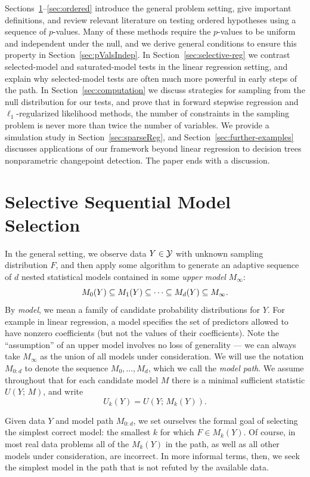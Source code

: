 \documentclass{article}
\begin{document}
Sections~\ref{sec:genericSetting}--\ref{sec:ordered} introduce the general problem setting, give important definitions, and review relevant literature on testing ordered hypotheses using a sequence of $p$-values. Many of these methods require the $p$-values to be uniform and independent under the null, and we derive general conditions to ensure this property in Section~\ref{sec:pValsIndep}. In Section~\ref{sec:selective-reg} we contrast selected-model and saturated-model tests in the linear regression setting, and explain why selected-model tests are often much more powerful in early steps of the path. In Section~\ref{sec:computation} we discuss strategies for sampling from the null distribution for our tests, and prove that in forward stepwise regression and $\ell_1$-regularized likelihood methods, the number of constraints in the sampling problem is never more than twice the number of variables. We provide a simulation study in Section~\ref{sec:sparseReg}, and Section~\ref{sec:further-examples} discusses applications of our framework beyond linear regression to decision trees nonparametric changepoint detection. The paper ends with a discussion.

\section{Selective Sequential Model Selection}
\label{sec:genericSetting}

In the general setting, we observe data $Y \in \mathcal{Y}$ with unknown sampling distribution $F$, and then apply some algorithm to generate an adaptive sequence of $d$ nested statistical models contained in some {\em upper model} $M_{\infty}$:
\[
M_0(Y) \subseteq M_1(Y) \subseteq \cdots \subseteq M_d(Y) \subseteq M_\infty.
\]
By {\em model}, we mean a family of candidate probability distributions for $Y$. For example in  linear regression, a model specifies  the set of
predictors allowed to have nonzero coefficients (but not the  values of their coefficients). Note the ``assumption'' of an upper model involves no loss of generality --- we can always take $M_\infty$ as the union of all models under consideration. We will use the notation $M_{0:d}$ to denote the sequence $M_0, \ldots, M_d$, which we call the {\em model path}. We assume throughout that for each candidate model $M$ there is a minimal sufficient statistic $U(Y; \,M)$, and write
\[
U_k(Y) = U(Y; \,M_k(Y)).
\]

Given data $Y$ and model path $M_{0:d}$, we set ourselves the formal goal of selecting the simplest correct model: the smallest $k$ for which $F\in M_k(Y)$. Of course, in most real data problems all of the $M_k(Y)$ in the path, as well as all other models under consideration, are incorrect. In more informal terms, then, we seek the simplest model in the path that is not refuted by the available data.
\end{document}
